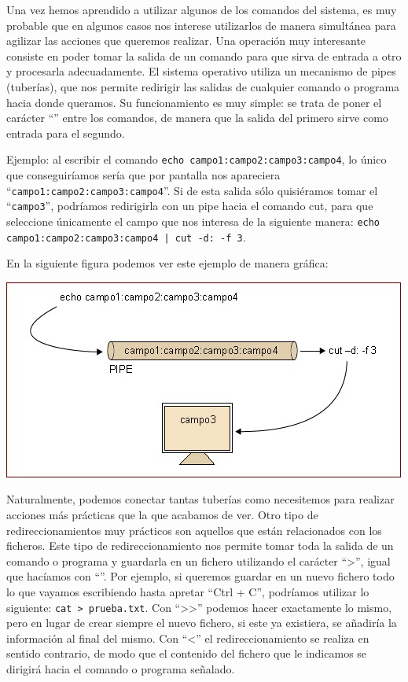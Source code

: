 \documentclass[12pt]{article}
\begin{document}
Una vez hemos aprendido a utilizar algunos de los comandos del sistema, es muy probable que en 
algunos casos nos interese utilizarlos de manera simultánea para agilizar las 
acciones que queremos realizar. Una operación muy interesante consiste en poder 
tomar la salida de un comando para que sirva de entrada a otro y procesarla adecuadamente. 
El sistema operativo utiliza un mecanismo de pipes (tuberías), que nos permite redirigir las salidas 
de cualquier comando o programa hacia donde queramos. Su funcionamiento es muy simple: se trata de poner el 
carácter ``\textbar'' entre los comandos, de manera que la salida del primero sirve como
 entrada para el segundo.

Ejemplo: al escribir el comando 
\texttt{echo campo1:campo2:campo3:campo4}, lo único que conseguiríamos sería que por 
pantalla nos apareciera ``\texttt{campo1:campo2:campo3:campo4}''. Si de esta salida sólo 
quisiéramos tomar el  ``\texttt{campo3}'', podríamos redirigirla con un pipe hacia el 
comando cut, para que seleccione únicamente el campo que nos interesa de la siguiente manera: 
\texttt{echo campo1:campo2:campo3:campo4 | cut -d: -f 3}. 

En la siguiente figura podemos ver este ejemplo de manera gráfica:

\begin{center}
 \includegraphics{./img/redireccionamiento.jpg}
\end{center}


Naturalmente, podemos conectar tantas tuberías como necesitemos para realizar 
acciones más prácticas que la que acabamos de ver. Otro tipo de 
redireccionamientos muy prácticos son aquellos que están relacionados con los 
ficheros. Este tipo de redireccionamiento nos permite tomar toda la salida de 
un comando o programa y guardarla en un fichero utilizando el carácter ``\textgreater'', 
igual que hacíamos con ``\textbar''. Por ejemplo, si queremos guardar en un nuevo 
fichero todo lo que vayamos escribiendo hasta apretar ``Ctrl + C'', podríamos 
utilizar lo siguiente: \texttt{cat > prueba.txt}. Con ``\textgreater \textgreater'' 
podemos hacer exactamente 
lo mismo, pero en lugar de crear siempre el nuevo fichero, si este ya 
existiera, se añadiría la información al final del mismo. Con ``\textless'' el 
redireccionamiento se realiza en sentido contrario, de modo que el 
contenido del fichero que le indicamos se dirigirá hacia el comando o programa 
señalado.
\end{document}
